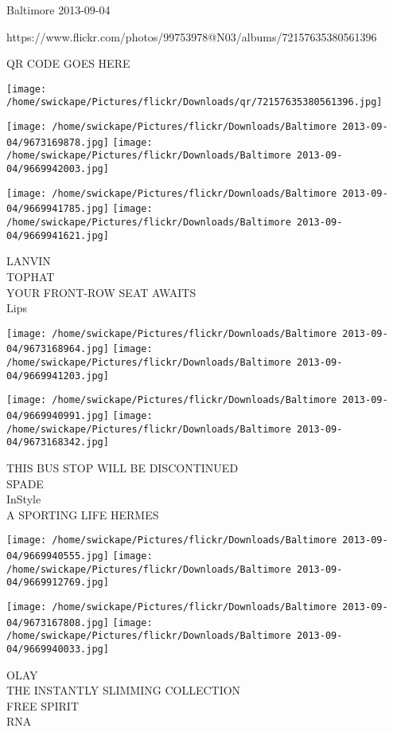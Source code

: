 \documentclass[10pt,letterpaper]{article}
\begin{document}
Baltimore 2013-09-04

https://www.flickr.com/photos/99753978@N03/albums/72157635380561396

QR CODE GOES HERE

\texttt{[image: /home/swickape/Pictures/flickr/Downloads/qr/72157635380561396.jpg]}
\pagebreak

\texttt{[image: /home/swickape/Pictures/flickr/Downloads/Baltimore 2013-09-04/9673169878.jpg]}
\texttt{[image: /home/swickape/Pictures/flickr/Downloads/Baltimore 2013-09-04/9669942003.jpg]}

\texttt{[image: /home/swickape/Pictures/flickr/Downloads/Baltimore 2013-09-04/9669941785.jpg]}
\texttt{[image: /home/swickape/Pictures/flickr/Downloads/Baltimore 2013-09-04/9669941621.jpg]}

LANVIN\\
TOPHAT\\
YOUR FRONT{-}ROW SEAT AWAITS\\
Lips\\
\pagebreak

\texttt{[image: /home/swickape/Pictures/flickr/Downloads/Baltimore 2013-09-04/9673168964.jpg]}
\texttt{[image: /home/swickape/Pictures/flickr/Downloads/Baltimore 2013-09-04/9669941203.jpg]}

\texttt{[image: /home/swickape/Pictures/flickr/Downloads/Baltimore 2013-09-04/9669940991.jpg]}
\texttt{[image: /home/swickape/Pictures/flickr/Downloads/Baltimore 2013-09-04/9673168342.jpg]}

THIS BUS STOP WILL BE DISCONTINUED\\
SPADE\\
InStyle\\
A SPORTING LIFE HERMES\\
\pagebreak

\texttt{[image: /home/swickape/Pictures/flickr/Downloads/Baltimore 2013-09-04/9669940555.jpg]}
\texttt{[image: /home/swickape/Pictures/flickr/Downloads/Baltimore 2013-09-04/9669912769.jpg]}

\texttt{[image: /home/swickape/Pictures/flickr/Downloads/Baltimore 2013-09-04/9673167808.jpg]}
\texttt{[image: /home/swickape/Pictures/flickr/Downloads/Baltimore 2013-09-04/9669940033.jpg]}

OLAY\\
THE INSTANTLY SLIMMING COLLECTION\\
FREE SPIRIT\\
RNA\\
\pagebreak
\end{document}
